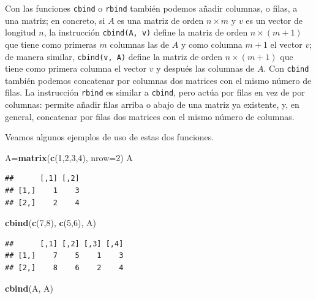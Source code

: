 \documentclass[]{book}
\newenvironment{Shaded}{\begin{snugshade}}{\end{snugshade}}
\newcommand{\DataTypeTok}[1]{\textcolor[rgb]{0.13,0.29,0.53}{#1}}
\newcommand{\DecValTok}[1]{\textcolor[rgb]{0.00,0.00,0.81}{#1}}
\newcommand{\KeywordTok}[1]{\textcolor[rgb]{0.13,0.29,0.53}{\textbf{#1}}}
\newcommand{\NormalTok}[1]{#1}
\theoremstyle{definition}
\theoremstyle{definition}
\theoremstyle{definition}
\theoremstyle{remark}
\begin{document}
Con las funciones \texttt{cbind} o \texttt{rbind} también podemos añadir columnas, o filas, a una matriz; en concreto, si \(A\) es una matriz de orden \(n\times m\) y \(v\) es un vector de longitud \(n\), la instrucción \texttt{cbind(A,\ v)} define la matriz de orden \(n\times(m+1)\) que tiene como primeras \(m\) columnas las de \(A\) y como columna \(m+1\) el vector \(v\); de manera similar, \texttt{cbind(v,\ A)} define la matriz de orden \(n\times(m+1)\) que tiene como primera columna el vector \(v\) y después las columnas de \(A\). Con \texttt{cbind} también podemos concatenar por columnas dos matrices con el mismo número de filas. La instrucción \texttt{rbind} es similar a \texttt{cbind}, pero actúa por filas en vez de por columnas: permite añadir filas arriba o abajo de una matriz ya existente, y, en general, concatenar por filas dos matrices con el mismo número de columnas.

Veamos algunos ejemplos de uso de estas dos funciones.

\begin{Shaded}
\begin{Highlighting}[]
\NormalTok{A=}\KeywordTok{matrix}\NormalTok{(}\KeywordTok{c}\NormalTok{(}\DecValTok{1}\NormalTok{,}\DecValTok{2}\NormalTok{,}\DecValTok{3}\NormalTok{,}\DecValTok{4}\NormalTok{), }\DataTypeTok{nrow=}\DecValTok{2}\NormalTok{)}
\NormalTok{A}
\end{Highlighting}
\end{Shaded}

\begin{verbatim}
##      [,1] [,2]
## [1,]    1    3
## [2,]    2    4
\end{verbatim}

\begin{Shaded}
\begin{Highlighting}[]
\KeywordTok{cbind}\NormalTok{(}\KeywordTok{c}\NormalTok{(}\DecValTok{7}\NormalTok{,}\DecValTok{8}\NormalTok{), }\KeywordTok{c}\NormalTok{(}\DecValTok{5}\NormalTok{,}\DecValTok{6}\NormalTok{), A)}
\end{Highlighting}
\end{Shaded}

\begin{verbatim}
##      [,1] [,2] [,3] [,4]
## [1,]    7    5    1    3
## [2,]    8    6    2    4
\end{verbatim}

\begin{Shaded}
\begin{Highlighting}[]
\KeywordTok{cbind}\NormalTok{(A, A)}
\end{Highlighting}
\end{Shaded}
\end{document}
